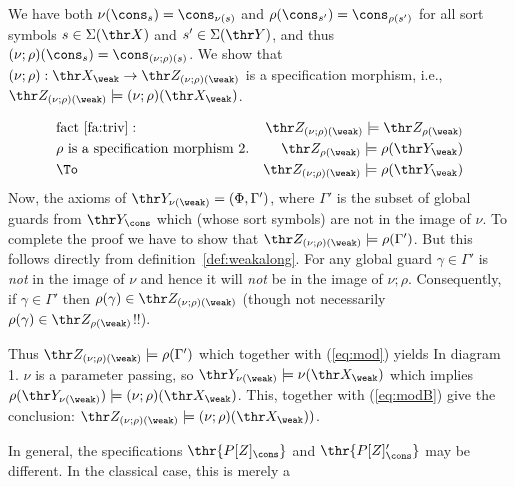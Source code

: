 \begin{PROOF}
We have both $\nu(\cons_s)=\cons_{\nu(s)}$ and
$\rho(\cons_{s'})=\cons_{\rho(s')}$ for all sort symbols $s\in\Sigma(\thr X)$
and $s'\in\Sigma(\thr Y)$, and thus
$(\nu;\rho)(\cons_s)=\cons_{(\nu;\rho)(s)}$. We show that
$(\nu;\rho):\thr X_\weak \to \thr Z_{(\nu;\rho)(\weak)}$ is
a specification morphism, i.e., $\thr Z_{(\nu;\rho)(\weak)} \models
(\nu;\rho)(\thr X_\weak)$.

\begin{eqnarray}%
&{\rm fact\ \ref{fa:triv}} :& \thr Z_{(\nu;\rho)(\weak)}\models \thr Z_{\rho(\weak)} \nonumber \\
&\rho\ {\rm is\ a\ specification\ morphism}\ 2.& \thr Z_{\rho(\weak)}\models\rho(\thr Y_\weak) \nonumber \\
& \To & \thr Z_{(\nu;\rho)(\weak)}\models\rho(\thr Y_\weak) \label{eq:mod}
\end{eqnarray}
%
%
Now, the axioms of $\thr Y_{\nu(\weak)} =  (\Phi,\Gamma')$, where $\Gamma'$
is the subset of global guards from $\thr Y_\cons$ which (whose sort symbols)
are not in the image
of $\nu$. To complete the proof we have to show that $\thr
Z_{(\nu;\rho)(\weak)}\models \rho(\Gamma')$.
But this follows directly from definition~\ref{def:weakalong}. For any
global guard $\gamma\in\Gamma'$ is {\em not} in the image of $\nu$ and hence
it will {\em not} be in the image of $\nu;\rho$. Consequently, if
$\gamma\in\Gamma'$ then
$\rho(\gamma)\in\thr Z_{(\nu;\rho)(\weak)}$ (though not necessarily 
 $\rho(\gamma)\in \thr Z_{\rho(\weak)}$!!).

Thus $\thr Z_{(\nu;\rho)(\weak)}\models \rho(\Gamma')$ which together with (\ref{eq:mod})
yields
In diagram 1. $\nu$ is a parameter passing, so $\thr
Y_{\nu(\weak)}\models \nu(\thr X_\weak)$ which implies  
$\rho(\thr Y_{\nu(\weak)})\models (\nu;\rho)(\thr X_\weak)$.
This, together with (\ref{eq:modB}) give the conclusion: 
$\thr Z_{(\nu;\rho)(\weak)}\models (\nu;\rho)(\thr X_{\weak}))$.
\end{PROOF}
In general, the specifications $\thr{P[Z]_\cons}$ and
$\thr{P[Z]'_\cons}$ may be different. In the classical case, this is merely a
